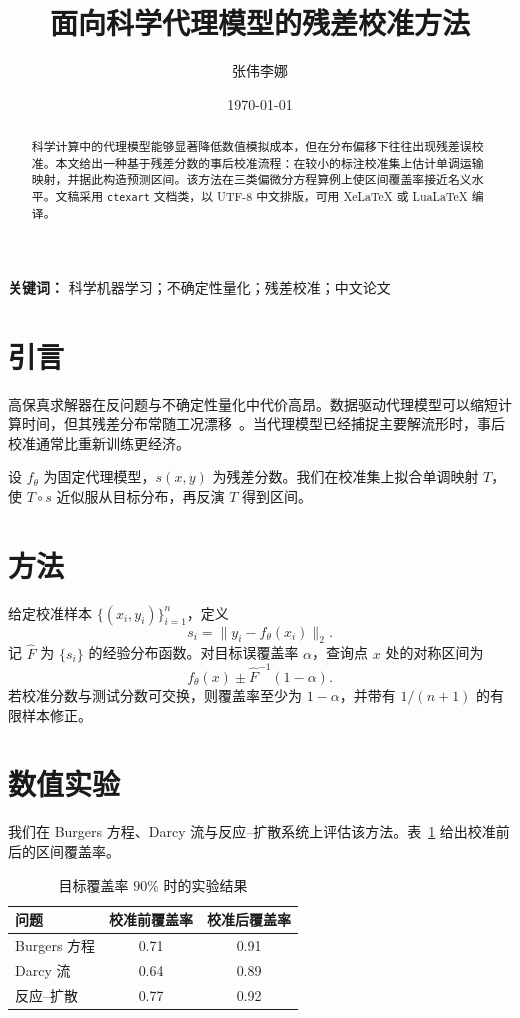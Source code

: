 \documentclass[UTF8,a4paper,11pt]{ctexart}
\title{面向科学代理模型的残差校准方法}
\author{张伟\quad 李娜}
\date{\today}
\begin{document}
\maketitle

\begin{abstract}
科学计算中的代理模型能够显著降低数值模拟成本，但在分布偏移下往往出现残差误校准。本文给出一种基于残差分数的事后校准流程：在较小的标注校准集上估计单调运输映射，并据此构造预测区间。该方法在三类偏微分方程算例上使区间覆盖率接近名义水平。文稿采用 \texttt{ctexart} 文档类，以 UTF-8 中文排版，可用 XeLaTeX 或 LuaLaTeX 编译。
\end{abstract}

\noindent\textbf{关键词：} 科学机器学习；不确定性量化；残差校准；中文论文

\section{引言}

高保真求解器在反问题与不确定性量化中代价高昂。数据驱动代理模型可以缩短计算时间，但其残差分布常随工况漂移~\cite{raissi2019,karniadakis2021}。当代理模型已经捕捉主要解流形时，事后校准通常比重新训练更经济。

设 $f_\theta$ 为固定代理模型，$s(x,y)$ 为残差分数。我们在校准集上拟合单调映射 $T$，使 $T\circ s$ 近似服从目标分布，再反演 $T$ 得到区间。

\section{方法}

给定校准样本 $\{(x_i,y_i)\}_{i=1}^{n}$，定义
\begin{equation}
  s_i = \|y_i - f_\theta(x_i)\|_2.
\end{equation}
记 $\hat{F}$ 为 $\{s_i\}$ 的经验分布函数。对目标误覆盖率 $\alpha$，查询点 $x$ 处的对称区间为
\begin{equation}
  f_\theta(x) \pm \hat{F}^{-1}(1-\alpha).
\end{equation}
若校准分数与测试分数可交换，则覆盖率至少为 $1-\alpha$，并带有 $1/(n+1)$ 的有限样本修正。

\section{数值实验}

我们在 Burgers 方程、Darcy 流与反应--扩散系统上评估该方法。表~\ref{tab:cn-coverage} 给出校准前后的区间覆盖率。

\begin{table}[t]
\centering
\caption{目标覆盖率 $90\%$ 时的实验结果}
\label{tab:cn-coverage}
\begin{tabular}{@{}lcc@{}}
\toprule
问题 & 校准前覆盖率 & 校准后覆盖率 \\
\midrule
Burgers 方程 & 0.71 & 0.91 \\
Darcy 流 & 0.64 & 0.89 \\
反应--扩散 & 0.77 & 0.92 \\
\bottomrule
\end{tabular}
\end{table}
\end{document}
